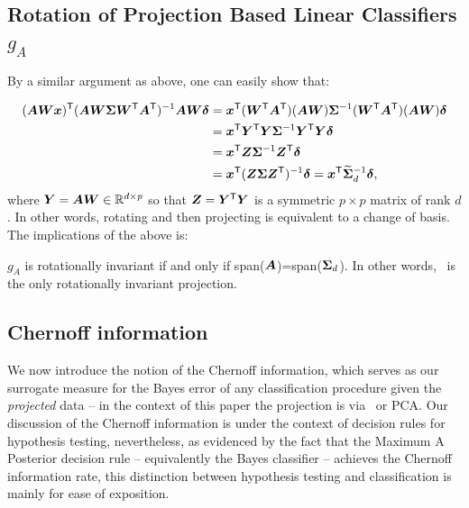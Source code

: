 \documentclass[10pt]{article}
\begin{document}
\subsection[]{Rotation of Projection Based Linear Classifiers $g_A$}

By a similar argument as above, one can easily show that:

\begin{align*}
(\bA  \bW \bx) \T  (\bA \bW  \bSig  \bW\T \bA\T)^{-1} \bA \bW \bdel
&= \bx\T (\bW\T \bA\T) (\bA \bW) \bSig^{-1} (\bW\T \bA\T) (\bA \bW) \bdel \\
&= \bx\T \bY\T \bY \bSig^{-1} \bY\T \bY \bdel \\
&= \bx\T \bZ \bSig^{-1} \bZ\T \bdel \\
&= \bx\T (\bZ \bSig \bZ\T)^{-1} \bdel = \bx\T \mt{\bSig}_d^{-1} \bdel,
\end{align*}
where $\bY = \bA \bW \in \Real^{d \times p}$ so that $\bZ=\bY\T \bY$ is a symmetric ${p \times p}$ matrix of rank $d$.  In other words, rotating and then projecting is equivalent to a change of basis.
The implications of the above is:
\begin{lem}
$g_A$ is rotationally invariant if and only if span($\bA$)=span($\bSig_d$).
In other words, \Pca~is the only rotationally invariant projection.
\end{lem}

\subsection{Chernoff information}
We now introduce the notion of the Chernoff information, which serves as our surrogate measure for the Bayes error of any classification procedure given the {\em projected} data -- in the context of this paper the projection is via \Lol~or PCA. Our discussion of the Chernoff information is under the context of decision rules for hypothesis testing, nevertheless, as evidenced by the fact that the Maximum A Posterior decision rule -- equivalently the Bayes classifier -- achieves the Chernoff information rate, this distinction between hypothesis testing and classification is mainly for ease of exposition.
\end{document}
